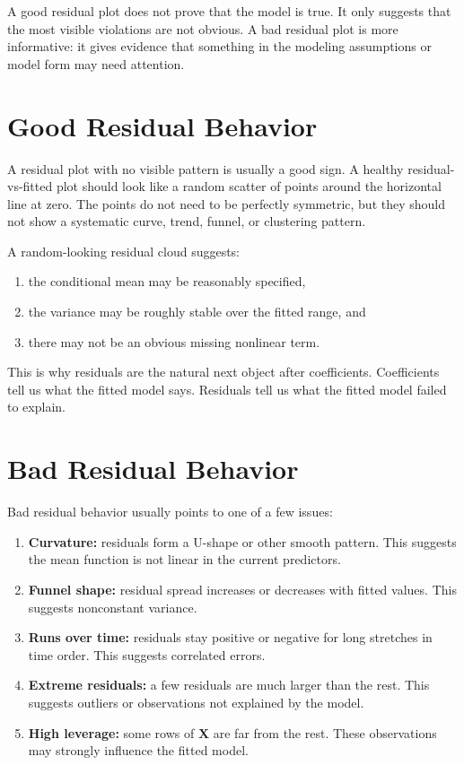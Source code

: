 A good residual plot does not prove that the model is true.  It only suggests that the most visible violations are not obvious.  A bad residual plot is more informative: it gives evidence that something in the modeling assumptions or model form may need attention.

\section{Good Residual Behavior}

A residual plot with no visible pattern is usually a good sign.  A healthy residual-vs-fitted plot should look like a random scatter of points around the horizontal line at zero.  The points do not need to be perfectly symmetric, but they should not show a systematic curve, trend, funnel, or clustering pattern.

A random-looking residual cloud suggests:
\begin{enumerate}
  \item the conditional mean may be reasonably specified,
  \item the variance may be roughly stable over the fitted range, and
  \item there may not be an obvious missing nonlinear term.
\end{enumerate}

This is why residuals are the natural next object after coefficients.  Coefficients tell us what the fitted model says.  Residuals tell us what the fitted model failed to explain.

\section{Bad Residual Behavior}

Bad residual behavior usually points to one of a few issues:
\begin{enumerate}
  \item \textbf{Curvature:} residuals form a U-shape or other smooth pattern.  This suggests the mean function is not linear in the current predictors.
  \item \textbf{Funnel shape:} residual spread increases or decreases with fitted values.  This suggests nonconstant variance.
  \item \textbf{Runs over time:} residuals stay positive or negative for long stretches in time order.  This suggests correlated errors.
  \item \textbf{Extreme residuals:} a few residuals are much larger than the rest.  This suggests outliers or observations not explained by the model.
  \item \textbf{High leverage:} some rows of \(\mathbf{X}\) are far from the rest.  These observations may strongly influence the fitted model.
\end{enumerate}

